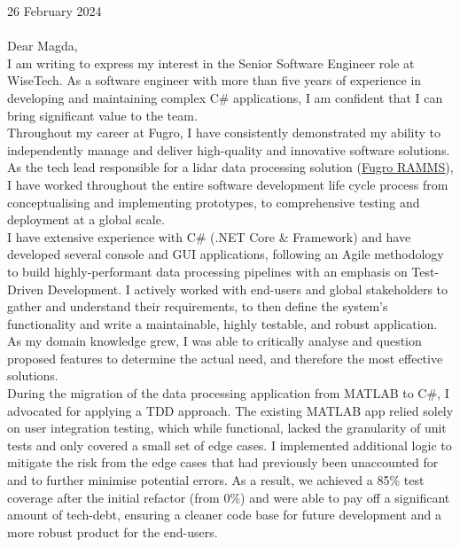 \vspace{30pt}

26 February 2024 \\ \\

Dear Magda, \\

I am writing to express my interest in the Senior Software Engineer role at WiseTech. As a software engineer with more than five years of experience in developing and maintaining complex C\# applications, I am confident that I can bring significant value to the team. \\

Throughout my career at Fugro, I have consistently demonstrated my ability to independently manage and deliver high-quality and innovative software solutions. As the tech lead responsible for a lidar data processing solution (\href{https://www.youtube.com/watch?v=f65bdm4tous}{\underline{Fugro RAMMS}}), I have worked throughout the entire software development life cycle process from conceptualising and implementing prototypes, to comprehensive testing and deployment at a global scale. \\

I have extensive experience with C\# (.NET Core \& Framework) and have developed several console and GUI applications, following an Agile methodology to build highly-performant data processing pipelines with an emphasis on Test-Driven Development. I actively worked with end-users and global stakeholders to gather and understand their requirements, to then define the system's functionality and write a maintainable, highly testable, and robust application. As my domain knowledge grew, I was able to critically analyse and question proposed features to determine the actual need, and therefore the most effective solutions. \\

During the migration of the data processing application from MATLAB to C\#, I advocated for applying a TDD approach. The existing MATLAB app relied solely on user integration testing, which while functional, lacked the granularity of unit tests and only covered a small set of edge cases. I implemented additional logic to mitigate the risk from the edge cases that had previously been unaccounted for and to further minimise potential errors. As a result, we achieved a 85\% test coverage after the initial refactor (from 0\%) and were able to pay off a significant amount of tech-debt, ensuring a cleaner code base for future development and a more robust product for the end-users.\\

